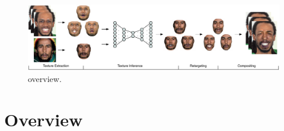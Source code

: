 \begin{figure}[t]
\begin{center}
   \includegraphics[width=\textwidth]{figures/overview/overview.pdf}
\end{center}
   \caption{overview.}
\label{fig:overview}
\end{figure}

\section{Overview}




